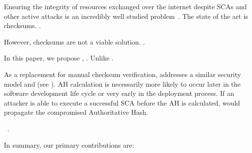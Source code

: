 Ensuring the integrity of resources exchanged over the internet despite SCAs and
other active attacks is an incredibly well studied problem~\cite{MD5Header,
HTTP1.1, HTTPS, SRI, LF, OpenPGP1, DNSSEC}. The state of the art is checksums.
.

However, checksums are not a viable solution. .

In this paper, we propose \SYSTEM{}, . Unlike .

As a replacement for manual checksum verification, \SYSTEM{} addresses a similar
security model and   (see ). AH calculation is necessarily more
likely to occur later in the software development life cycle or very early in
the deployment process. If an attacker is able to execute a successful SCA
before the AH is calculated, \SYSTEM{} would propagate the compromised
Authoritative Hash.

~\cite{DNSSEC}.


In summary, our primary contributions are:

